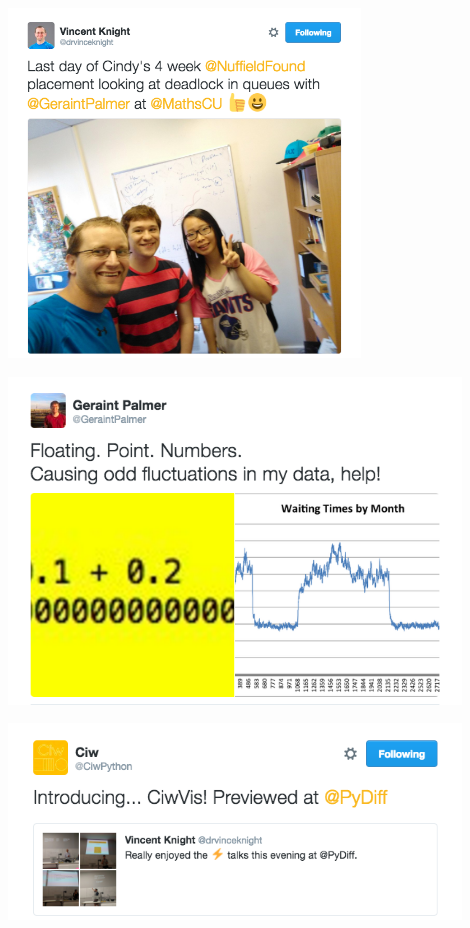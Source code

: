 \documentclass{beamer}
\begin{document}
\begin{frame}
  \begin{center}
  \href{https://twitter.com/drvinceknight/status/766215470945009664}{\includegraphics[width=0.7\textwidth]{tweets/nuffield_cindy}}
  \end{center}
\end{frame}

\begin{frame}
  \begin{center}
  \href{https://twitter.com/GeraintPalmer/status/710479754047197185}{\includegraphics[width=0.9\textwidth]{tweets/floating_point_numbers}}
  \end{center}
\end{frame}

\begin{frame}
  \begin{center}
  \href{https://twitter.com/CiwPython/status/765638369669939200}{\includegraphics[width=0.9\textwidth]{tweets/ciwvis}}
  \end{center}
\end{frame}
\end{document}
